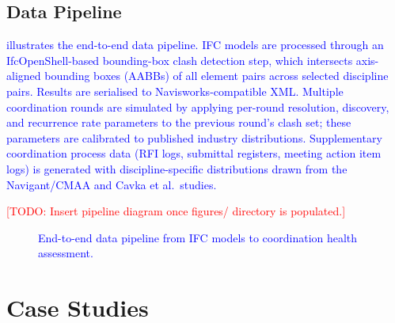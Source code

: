 \documentclass[conference]{IEEEtran}
\newcommand{\todo}[1]{\textcolor{red}{[TODO: #1]}}
\newcommand{\placeholder}[1]{\textcolor{blue}{#1}}
\begin{document}
\subsection{Data Pipeline}
\placeholder{
 illustrates the end-to-end data pipeline. IFC models are processed through an IfcOpenShell-based bounding-box clash detection step, which intersects axis-aligned bounding boxes (AABBs) of all element pairs across selected discipline pairs. Results are serialised to Navisworks-compatible XML. Multiple coordination rounds are simulated by applying per-round resolution, discovery, and recurrence rate parameters to the previous round's clash set; these parameters are calibrated to published industry distributions. Supplementary coordination process data (RFI logs, submittal registers, meeting action item logs) is generated with discipline-specific distributions drawn from the Navigant/CMAA and Cavka et al.\ studies.

\todo{Insert pipeline diagram once figures/ directory is populated.}

\begin{figure}[htbp]
    \centering
    \fbox{\rule{0pt}{3cm}\rule{\columnwidth}{0pt}}
    \caption{End-to-end data pipeline from IFC models to coordination health assessment.}
    \label{fig:pipeline}
\end{figure}
}

\section{Case Studies}
\end{document}
